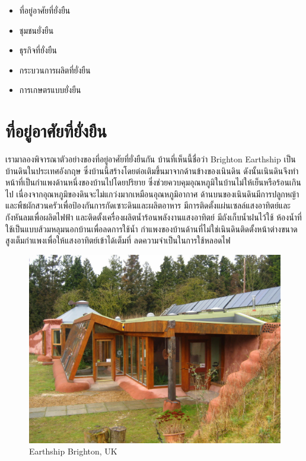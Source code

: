 \documentclass[a4paper,nobib,openany]{tufte-book}
\begin{document}
\begin{itemize}
\item ที่อยู่อาศัยที่ยั่งยืน

\item ชุมชนยั่งยืน

\item ธุรกิจที่ยั่งยืน

\item กระบวนการผลิตที่ยั่งยืน

\item การเกษตรแบบยั่งยืน
\end{itemize}

\section{ที่อยู่อาศัยที่ยั่งยืน}
\label{sec:org38b4fdb}
เรามาลองพิจารณาตัวอย่างของที่อยู่อาศัยที่ยั่งยืนกัน
บ้านที่เห็นนี้ชื่อว่า Brighton Earthship เป็นบ้านดินในประเทศอังกฤษ
ซึ่งบ้านนี้สร้างโดยต่อเติมขึ้นมาจากด้านข้างของเนินดิน
ดังนั้นเนินดินจึงทำหน้าที่เป็นกำแพงด้านหนึ่งของบ้านไปโดยปริยาย
ซึ่งช่วยควบคุมอุณหภูมิในบ้านไม่ให้เย็นหรือร้อนเกินไป
เนื่องจากอุณหภูมิของดินจะไม่แกว่งมากเหมือนอุณหภูมิอากาศ
ด้านบนของเนินดินมีการปลูกหญ้าและพืชผักสวนครัวเพื่อป้องกันการกัดเซาะดินและผลิตอาหาร
มีการติดตั้งแผ่นเซลล์แสงอาทิตย์และกังหันลมเพื่อผลิตไฟฟ้า
และติดตั้งเครื่องผลิตน้ำร้อนพลังงานแสงอาทิตย์ มีถังเก็บน้ำฝนไว้ใช้
ห้องน้ำที่ใช้เป็นแบบส้วมหลุมนอกบ้านเพื่อลดการใช้น้ำ
กำแพงของบ้านด้านที่ไม่ใช่เนินดินติดตั้งหน้าต่างขนาดสูงเต็มกำแพงเพื่อให้แสงอาทิตย์เข้าได้เต็มที่
ลดความจำเป็นในการใช้หลอดไฟ

\begin{figure}[htbp]
\centering
\includegraphics[width=.9\linewidth]{./pictures/earthship-brighton.jpg}
\caption{\label{fig: earthship-brighton}Earthship Brighton, UK}
\end{figure}
\end{document}

